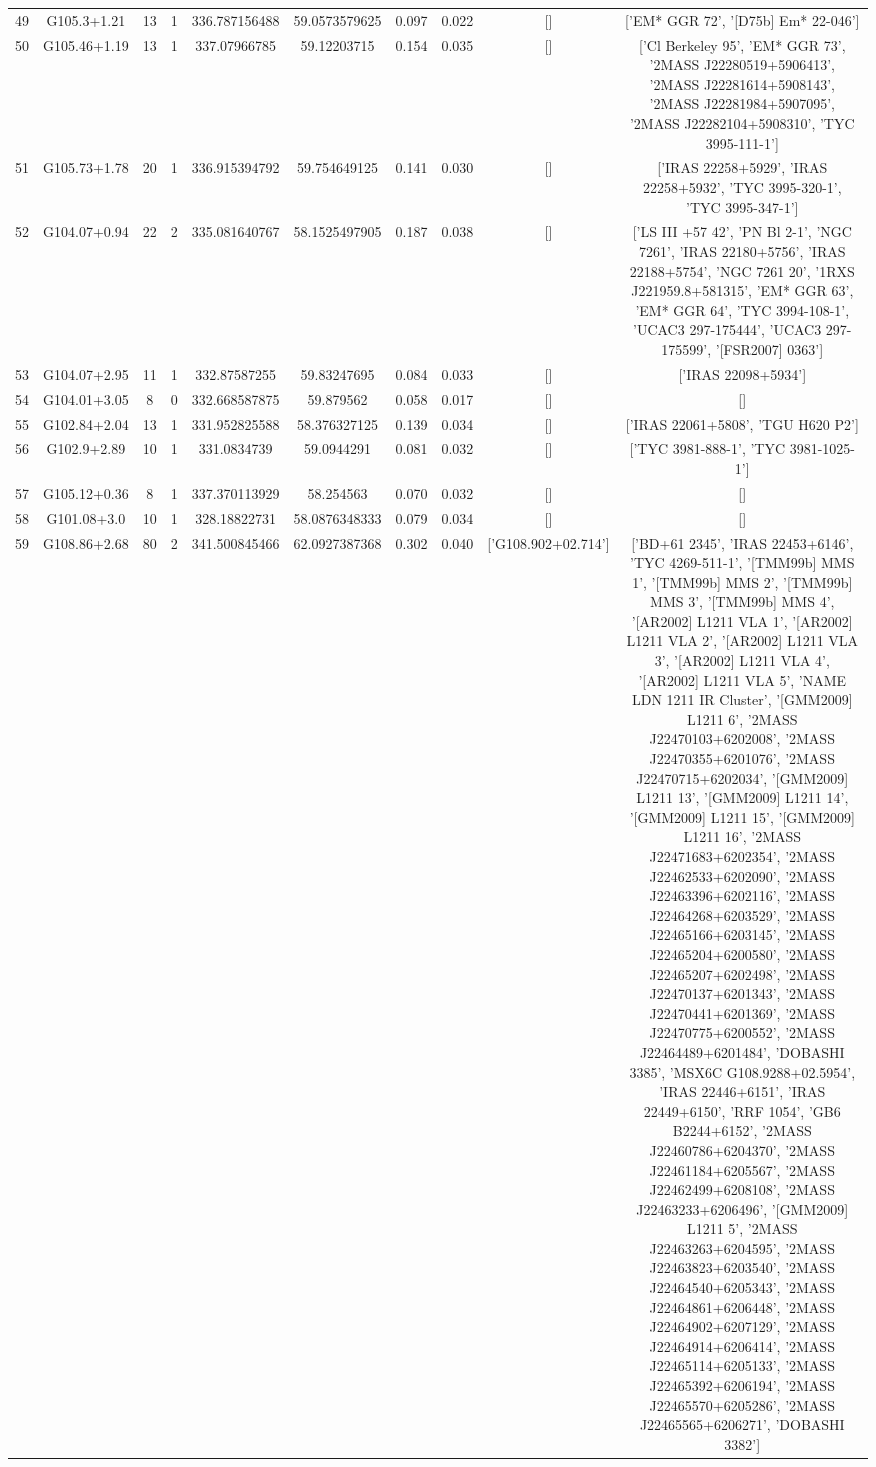 \begin{table}
\begin{tabular}{cccccccccc}
49 & G105.3+1.21 & 13 & 1 & 336.787156488 & 59.0573579625 & 0.097 & 0.022 & [] & ['EM* GGR   72', '[D75b] Em* 22-046'] \\
50 & G105.46+1.19 & 13 & 1 & 337.07966785 & 59.12203715 & 0.154 & 0.035 & [] & ['Cl Berkeley   95', 'EM* GGR   73', '2MASS J22280519+5906413', '2MASS J22281614+5908143', '2MASS J22281984+5907095', '2MASS J22282104+5908310', 'TYC 3995-111-1'] \\
51 & G105.73+1.78 & 20 & 1 & 336.915394792 & 59.754649125 & 0.141 & 0.030 & [] & ['IRAS 22258+5929', 'IRAS 22258+5932', 'TYC 3995-320-1', 'TYC 3995-347-1'] \\
52 & G104.07+0.94 & 22 & 2 & 335.081640767 & 58.1525497905 & 0.187 & 0.038 & [] & ['LS III +57   42', 'PN Bl  2-1', 'NGC  7261', 'IRAS 22180+5756', 'IRAS 22188+5754', 'NGC  7261    20', '1RXS J221959.8+581315', 'EM* GGR   63', 'EM* GGR   64', 'TYC 3994-108-1', 'UCAC3 297-175444', 'UCAC3 297-175599', '[FSR2007] 0363'] \\
53 & G104.07+2.95 & 11 & 1 & 332.87587255 & 59.83247695 & 0.084 & 0.033 & [] & ['IRAS 22098+5934'] \\
54 & G104.01+3.05 & 8 & 0 & 332.668587875 & 59.879562 & 0.058 & 0.017 & [] & [] \\
55 & G102.84+2.04 & 13 & 1 & 331.952825588 & 58.376327125 & 0.139 & 0.034 & [] & ['IRAS 22061+5808', 'TGU H620 P2'] \\
56 & G102.9+2.89 & 10 & 1 & 331.0834739 & 59.0944291 & 0.081 & 0.032 & [] & ['TYC 3981-888-1', 'TYC 3981-1025-1'] \\
57 & G105.12+0.36 & 8 & 1 & 337.370113929 & 58.254563 & 0.070 & 0.032 & [] & [] \\
58 & G101.08+3.0 & 10 & 1 & 328.18822731 & 58.0876348333 & 0.079 & 0.034 & [] & [] \\
59 & G108.86+2.68 & 80 & 2 & 341.500845466 & 62.0927387368 & 0.302 & 0.040 & ['G108.902+02.714'] & ['BD+61  2345', 'IRAS 22453+6146', 'TYC 4269-511-1', '[TMM99b] MMS 1', '[TMM99b] MMS 2', '[TMM99b] MMS 3', '[TMM99b] MMS 4', '[AR2002] L1211 VLA 1', '[AR2002] L1211 VLA 2', '[AR2002] L1211 VLA 3', '[AR2002] L1211 VLA 4', '[AR2002] L1211 VLA 5', 'NAME LDN 1211 IR Cluster', '[GMM2009] L1211  6', '2MASS J22470103+6202008', '2MASS J22470355+6201076', '2MASS J22470715+6202034', '[GMM2009] L1211 13', '[GMM2009] L1211 14', '[GMM2009] L1211 15', '[GMM2009] L1211 16', '2MASS J22471683+6202354', '2MASS J22462533+6202090', '2MASS J22463396+6202116', '2MASS J22464268+6203529', '2MASS J22465166+6203145', '2MASS J22465204+6200580', '2MASS J22465207+6202498', '2MASS J22470137+6201343', '2MASS J22470441+6201369', '2MASS J22470775+6200552', '2MASS J22464489+6201484', 'DOBASHI 3385', 'MSX6C G108.9288+02.5954', 'IRAS 22446+6151', 'IRAS 22449+6150', 'RRF 1054', 'GB6 B2244+6152', '2MASS J22460786+6204370', '2MASS J22461184+6205567', '2MASS J22462499+6208108', '2MASS J22463233+6206496', '[GMM2009] L1211  5', '2MASS J22463263+6204595', '2MASS J22463823+6203540', '2MASS J22464540+6205343', '2MASS J22464861+6206448', '2MASS J22464902+6207129', '2MASS J22464914+6206414', '2MASS J22465114+6205133', '2MASS J22465392+6206194', '2MASS J22465570+6205286', '2MASS J22465565+6206271', 'DOBASHI 3382'] \\

\end{tabular}
\end{table}
